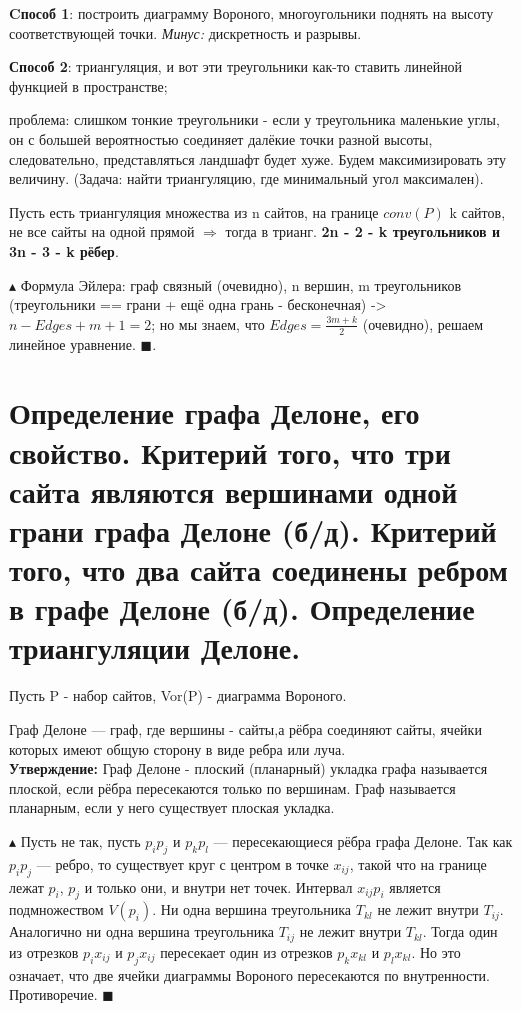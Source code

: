\textbf{Cпособ 1}: построить диаграмму Вороного, многоугольники поднять на высоту соответствующей точки. \textit{Минус:} дискретность и разрывы. 

\textbf{Способ 2}: триангуляция, и вот эти треугольники как-то ставить линейной функцией в пространстве; 

проблема: слишком тонкие треугольники - если у треугольника маленькие углы, он с большей вероятностью соединяет далёкие точки разной высоты, следовательно, представляться ландшафт будет хуже. Будем максимизировать эту величину. (Задача: найти триангуляцию, где минимальный угол максимален).

Пусть есть триангуляция множества из n сайтов, на границе $conv(P)$ k сайтов, не все сайты на одной прямой $\Rightarrow$ тогда в трианг. \textbf{2n - 2 - k треугольников и 3n - 3 - k рёбер}.

$\blacktriangle$ Формула Эйлера: граф связный (очевидно), n вершин, m треугольников (треугольники == грани + ещё одна грань - бесконечная) -> $n - Edges + m + 1 = 2$; но мы знаем, что $Edges = \frac{3m+k}{2}$ (очевидно), решаем линейное уравнение. $\blacksquare$.

\section{Определение графа Делоне, его свойство. Критерий того, что три сайта являются вершинами одной грани графа Делоне (б/д). Критерий того, что два сайта соединены ребром в графе Делоне (б/д). Определение триангуляции Делоне.}

Пусть P - набор сайтов, Vor(P) - диаграмма Вороного.


\Def Граф Делоне  — граф, где вершины - сайты,а рёбра соединяют сайты, ячейки которых имеют общую сторону в виде ребра или луча. \\

\textbf{Утверждение:} Граф Делоне - плоский (планарный) укладка графа называется плоской, если рёбра пересекаются только по вершинам.
Граф называется планарным, если у него существует плоская укладка.

$\blacktriangle$ Пусть не так, пусть $p_i p_j$ и $p_k p_l$ — пересекающиеся рёбра графа Делоне. Так как $p_i p_j$ — ребро, то существует круг с центром в точке $x_{ij}$, такой что на границе лежат $p_i$, $p_j$ и только они, и внутри нет точек. Интервал $x_{ij} p_i$ является подмножеством $V (p_i)$. Ни одна вершина треугольника $T_{kl}$ не лежит внутри $T_{ij}$. Аналогично ни одна вершина треугольника $T_{ij}$ не лежит внутри $T_{kl}$. Тогда один из отрезков $p_i x_{ij}$ и $p_j x_{ij}$ пересекает один из отрезков $p_k x_{kl}$ и $p_l x_{kl}$. Но это означает, что две ячейки диаграммы Вороного пересекаются по внутренности. Противоречие. $\blacksquare$

